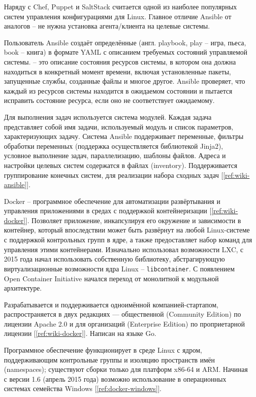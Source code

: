 Наряду с Chef, Puppet и SaltStack считается одной из наиболее популярных систем
управления конфигурациями для Linux. Главное отличие Ansible от аналогов -- не
нужна установка агента/клиента на целевые системы.

Пользователь Ansible создаёт определённые  (англ. playbook,
play -- игра, пьеса, book -- книга) в формате YAML с описанием требуемых
состояний управляемой системы.  -- это описание состояния
ресурсов системы, в котором она должна находиться в конкретный момент времени,
включая установленные пакеты, запущенные службы, созданные файлы и многое
другое. Ansible проверяет, что каждый из ресурсов системы находится в ожидаемом
состоянии и пытается исправить состояние ресурса, если оно не соответствует
ожидаемому.

Для выполнения задач используется система модулей. Каждая задача представляет
собой имя задачи, используемый модуль и список параметров, характеризующих
задачу. Система Ansible поддерживает переменные, фильтры обработки переменных
(поддержка осуществляется библиотекой Jinja2), условное
выполнение задач, параллелизацию, шаблоны файлов. Адреса и настройки целевых
систем содержатся в файлах  (inventory). Поддерживается
группирование конечных систем, для реализации набора сходных задач
[\ref{ref:wiki-ansible}].

Docker -- программное обеспечение для автоматизации развёртывания
и управления приложениями в средах с поддержкой контейнеризации
[\ref{ref:wiki-docker}].
Позволяет  приложение, инкапсулируя его окружение и
зависимости в контейнер, который впоследствии может быть развёрнут на любой
Linux-системе с поддержкой контрольных групп в ядре, а также предоставляет набор
команд для управления этими контейнерами.
Изначально использовал возможности LXC, с 2015 года начал использовать
собственную библиотеку, абстрагирующую виртуализационные возможности ядра Linux
-- \texttt{libcontainer}.
С появлением Open Container Initiative начался переход от монолитной к модульной
архитектуре.

Разрабатывается и поддерживается одноимённой компанией-стартапом,
распространяется в двух редакциях — общественной (Community Edition) по лицензии
Apache 2.0 и для организаций (Enterprise Edition) по проприетарной лицензии
[\ref{ref:wiki-docker}]. Написан на языке Go.

Программное обеспечение функционирует в среде Linux с ядром, поддерживающим
контрольные группы и изоляцию пространств имён (namespaces); существуют сборки
только для платформ x86-64 и ARM. Начиная с версии 1.6 (апрель 2015 года)
возможно использование в операционных системах семейства Windows
[\ref{ref:docker-windows}].
